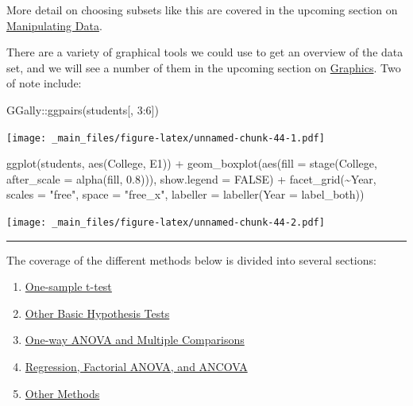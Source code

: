 \documentclass[
]{book}
\newenvironment{Shaded}{\begin{snugshade}}{\end{snugshade}}
\newcommand{\AttributeTok}[1]{\textcolor[rgb]{0.77,0.63,0.00}{#1}}
\newcommand{\ConstantTok}[1]{\textcolor[rgb]{0.00,0.00,0.00}{#1}}
\newcommand{\DecValTok}[1]{\textcolor[rgb]{0.00,0.00,0.81}{#1}}
\newcommand{\FloatTok}[1]{\textcolor[rgb]{0.00,0.00,0.81}{#1}}
\newcommand{\FunctionTok}[1]{\textcolor[rgb]{0.00,0.00,0.00}{#1}}
\newcommand{\NormalTok}[1]{#1}
\newcommand{\SpecialCharTok}[1]{\textcolor[rgb]{0.00,0.00,0.00}{#1}}
\newcommand{\StringTok}[1]{\textcolor[rgb]{0.31,0.60,0.02}{#1}}
\providecommand{\tightlist}{%
  \setlength{\itemsep}{0pt}\setlength{\parskip}{0pt}}
\begin{document}
More detail on choosing subsets like this are covered in the upcoming section on \protect\hyperlink{manipulating-data}{Manipulating Data}.

There are a variety of graphical tools we could use to get an overview of the data set, and we will see a number of them in the upcoming section on \protect\hyperlink{graphics}{Graphics}. Two of note include:

\begin{Shaded}
\begin{Highlighting}[]
\NormalTok{GGally}\SpecialCharTok{::}\FunctionTok{ggpairs}\NormalTok{(students[, }\DecValTok{3}\SpecialCharTok{:}\DecValTok{6}\NormalTok{])}
\end{Highlighting}
\end{Shaded}

\texttt{[image: \_main\_files/figure-latex/unnamed-chunk-44-1.pdf]}

\begin{Shaded}
\begin{Highlighting}[]
\FunctionTok{ggplot}\NormalTok{(students, }\FunctionTok{aes}\NormalTok{(College, E1)) }\SpecialCharTok{+}
  \FunctionTok{geom\_boxplot}\NormalTok{(}\FunctionTok{aes}\NormalTok{(}\AttributeTok{fill =} \FunctionTok{stage}\NormalTok{(College, }\AttributeTok{after\_scale =} \FunctionTok{alpha}\NormalTok{(fill, }\FloatTok{0.8}\NormalTok{))), }\AttributeTok{show.legend =} \ConstantTok{FALSE}\NormalTok{) }\SpecialCharTok{+}
  \FunctionTok{facet\_grid}\NormalTok{(}\SpecialCharTok{\textasciitilde{}}\NormalTok{Year, }\AttributeTok{scales =} \StringTok{"free"}\NormalTok{, }\AttributeTok{space =} \StringTok{"free\_x"}\NormalTok{, }\AttributeTok{labeller =} \FunctionTok{labeller}\NormalTok{(}\AttributeTok{Year =}\NormalTok{ label\_both))}
\end{Highlighting}
\end{Shaded}

\texttt{[image: \_main\_files/figure-latex/unnamed-chunk-44-2.pdf]}

\begin{center}\rule{0.5\linewidth}{0.5pt}\end{center}

The coverage of the different methods below is divided into several sections:

\begin{enumerate}
\def\labelenumi{\arabic{enumi}.}
\tightlist
\item
  \protect\hyperlink{one-sample-t-test}{One-sample t-test}
\item
  \protect\hyperlink{other-hypothesis-tests}{Other Basic Hypothesis Tests}
\item
  \protect\hyperlink{one-way-anova}{One-way ANOVA and Multiple Comparisons}
\item
  \protect\hyperlink{regression-ancova}{Regression, Factorial ANOVA, and ANCOVA}
\item
  \protect\hyperlink{other-methods}{Other Methods}
\end{enumerate}
\end{document}
